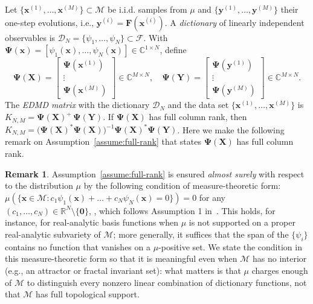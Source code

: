 \documentclass{article}
\theoremstyle{plain}
\theoremstyle{definition}
\newtheorem{remark}{Remark}
\def\R{\mathbb{R}}
\def\X{\mathbf{X}}
\def\x{\mathbf{x}}
\def\Y{\mathbf{Y}}
\def\y{\mathbf{y}}
\def\Fc{\mathcal{F}}
\def\Dc{\mathcal{D}}
\def\Mc{\mathcal{M}}
\newcommand{\arXivtag}[1][]{#1}
\begin{document}
Let $\{\x^{(1)}, \ldots, \x^{(M)}\} \subset \Mc$ be i.i.d. samples from $\mu$ and $\{\y^{(1)}, \ldots, \y^{(M)}\}$ their one-step evolutions, i.e., $\y^{(i)} = \mathbf{F}(\x^{(i)})$.
A \textit{dictionary} of linearly independent observables is $\arXivtag[\Dc_N =] \{\psi_1, \ldots, \psi_N\} \subset \Fc$. With $\mathbf{\Psi}(\x) = [\psi_1(\x), \ldots, \psi_N(\x)] \in \mathbb{C}^{1\times N}$, define
\begin{equation}\label{eq:eval-mat1}
	\mathbf{\Psi}(\X) = \begin{bmatrix}
		\mathbf{\Psi}(\x^{(1)}) \\ \vdots \\ \mathbf{\Psi}(\x^{(M)})
	\end{bmatrix} \in \mathbb{C}^{M\times N}, \quad
	\mathbf{\Psi}(\Y) = \begin{bmatrix}
		\mathbf{\Psi}(\y^{(1)}) \\ \vdots \\ \mathbf{\Psi}(\y^{(M)})
	\end{bmatrix} \in \mathbb{C}^{M\times N}.
\end{equation}
The \textit{EDMD matrix} \arXivtag[with the dictionary $\Dc_N$ and the data set $\{\x^{(1)}, \ldots, \x^{(M)}\}$] is $K_{N,M} = \mathbf{\Psi}(\X)^{+}\,\mathbf{\Psi}(\Y)$. If $\mathbf{\Psi}(\X)$ has full column rank, then $K_{N,M} = \bigl(\mathbf{\Psi}(\X)^{\ast}\mathbf{\Psi}(\X)\bigr)^{-1}\mathbf{\Psi}(\X)^{\ast}\mathbf{\Psi}(\Y)$. Here we make the following remark on Assumption~\ref{assume:full-rank} that states $\mathbf{\Psi}(\X)$ has full column rank.

\begin{remark}\label{rem:fullcolrank}
	Assumption~\ref{assume:full-rank} is ensured  \textit{almost surely} with respect to the distribution $\mu$ by the following condition of measure-theoretic form: 
	$\mu(\{ \x \in \Mc : c_1 \psi_1(\x) + \ldots + c_N\psi_N(\x) = 0 \}) = 0$ for any $(c_1, \ldots, c_N) \in \R^N \setminus\{\mathbf{0}\}$,
    \arXivtag[, which follows Assumption 1 in~\cite{korda2018convergence}.] 
	This holds, for instance, for real-analytic basis functions when $\mu$ is not supported on a proper real-analytic subvariety of $\Mc$; more generally, it suffices that the span of the $\{\psi_i\}$ contains no function that vanishes on a $\mu$-positive set. We state the condition in this measure-theoretic form so that it is meaningful even when $\Mc$ has no interior (e.g., an attractor or fractal invariant set): what matters is that $\mu$ charges enough of $\Mc$ to distinguish every nonzero linear combination of dictionary functions, not that $\Mc$ has full topological support.
\end{remark}
\end{document}
